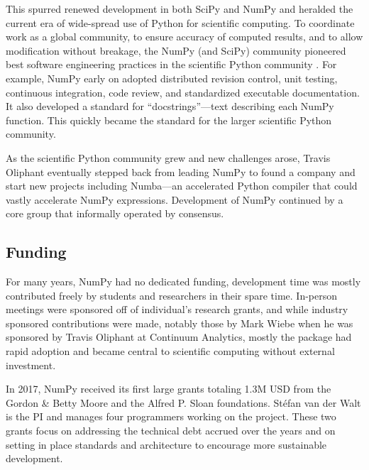 This spurred renewed development in both SciPy and NumPy and 
heralded the current era of wide-spread use of Python for scientific computing.
To coordinate work as a global community, to ensure accuracy of computed
results, and to allow modification without breakage, the NumPy (and SciPy) community
pioneered best software engineering practices in the scientific Python
community  \cite{millman2014developing}.
For example, NumPy early on adopted distributed revision control, unit testing,
continuous integration, code review, and standardized executable documentation.
It also developed a standard for ``docstrings''—text describing each NumPy function.
This quickly became the standard for the larger scientific Python community. 

As the scientific Python community grew and new challenges arose, Travis Oliphant
eventually stepped back from leading NumPy to found a company and start
new projects including Numba---an accelerated Python compiler that could vastly
accelerate NumPy expressions.
Development of NumPy continued by a core group that informally operated by consensus.


\subsection*{Funding}

For many years, NumPy had no dedicated funding, development
time was mostly contributed freely by students and researchers in
their spare time.  In-person meetings were sponsored off of
individual's research grants, and while industry sponsored
contributions were made, notably those by Mark Wiebe when he was
sponsored by Travis Oliphant at Continuum Analytics, mostly the
package had rapid adoption and became central to scientific computing
without external investment.

In 2017, NumPy received its first large grants totaling 1.3M USD from the
Gordon \& Betty Moore and the Alfred P. Sloan foundations.
Stéfan van der Walt is the PI and manages four programmers working on the project.
These two grants focus on addressing the technical debt accrued over the years and
on setting in place standards and architecture to encourage more sustainable development.

